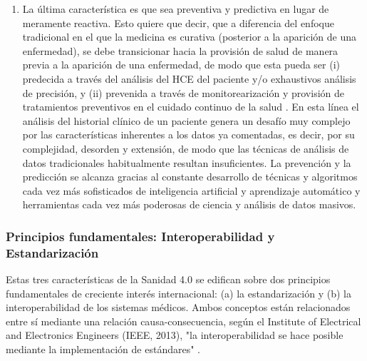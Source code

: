 \begin{enumerate}

\item La última característica es que sea preventiva y predictiva en lugar de meramente reactiva. Esto quiere que decir, que a diferencia del enfoque tradicional en el que la medicina es curativa (posterior a la aparición de una enfermedad), se debe transicionar hacia la provisión de salud de manera previa a la aparición de una enfermedad, de modo que esta pueda ser (i) predecida a través del análisis del HCE del paciente y/o exhaustivos análisis de precisión, y (ii) prevenida a través de monitorearización y provisión de tratamientos preventivos en el cuidado continuo de la salud \cite{ruiz2023inteligencia}. En esta línea el análisis del historial clínico de un paciente genera un desafío muy complejo por las características inherentes a los datos ya comentadas, es decir, por su complejidad, desorden y extensión, de modo que las técnicas de análisis de datos tradicionales habitualmente resultan insuficientes. La prevención y la predicción se alcanza gracias al constante desarrollo de técnicas y algoritmos cada vez más sofisticados de inteligencia artificial y aprendizaje automático y herramientas cada vez más poderosas de ciencia y análisis de datos masivos.
\end{enumerate}

\subsubsection{Principios fundamentales: Interoperabilidad y Estandarización}

Estas tres características de la Sanidad 4.0 se edifican sobre dos principios fundamentales de creciente interés internacional: (a) la estandarización y (b) la interoperabilidad de los sistemas médicos. Ambos conceptos están relacionados entre sí mediante una relación causa-consecuencia, según el Institute of Electrical and Electronics Engineers (IEEE, 2013), "la interoperabilidad se hace posible mediante la implementación de estándares" \cite{berryman2013data}.

